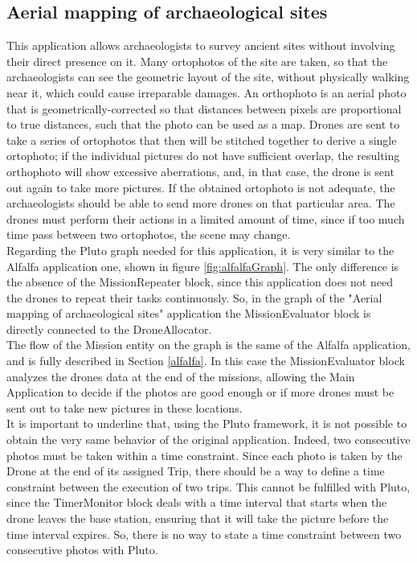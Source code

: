 \subsection{Aerial mapping of archaeological sites}\label{aerialMapping}

This application allows archaeologists to survey ancient sites without involving their direct presence on it.
Many ortophotos of the site are taken, so that the archaeologists can see the geometric layout of the site, without physically walking near it, which could cause irreparable damages.
An orthophoto is an aerial photo that is geometrically-corrected so that distances between pixels are proportional to true distances, such that the photo can be used as a map.
Drones are sent to take a series of ortophotos that then will be stitched together to derive a single ortophoto; if the individual pictures do not have sufficient overlap, the resulting orthophoto will show excessive aberrations, and, in that case, the drone is sent out again to take more pictures.
If the obtained ortophoto is not adequate, the archaeologists should be able to send more drones on that particular area.
The drones must perform their actions in a limited amount of time, since if too much time pass between two ortophotos, the scene may change.
\\

Regarding the Pluto graph needed for this application, it is very similar to the Alfalfa\cite{alfalfa} application one, shown in figure \ref{fig:alfalfaGraph}.
The only difference is the absence of the MissionRepeater block, since this application does not need the drones to repeat their tasks continuously.
So, in the graph of the "Aerial mapping of archaeological sites" application the MissionEvaluator block is directly connected to the DroneAllocator.
\\

The flow of the Mission entity on the graph is the same of the Alfalfa\cite{alfalfa} application, and is fully described in Section \ref{alfalfa}.
In this case the MissionEvaluator block analyzes the drones data at the end of the missions, allowing the Main Application to decide if the photos are good enough or if more drones must be sent out to take new pictures in these locations.
\\

It is important to underline that, using the Pluto framework, it is not possible to obtain the very same behavior of the original application.
Indeed, two consecutive photos must be taken within a time constraint.
Since each photo is taken by the Drone at the end of its assigned Trip, there should be a way to define a time constraint between the execution of two trips.
This cannot be fulfilled with Pluto, since the TimerMonitor block deals with a time interval that starts when the drone leaves the base station, ensuring that it will take the picture before the time interval expires.
So, there is no way to state a time constraint between two consecutive photos with Pluto.
\\

